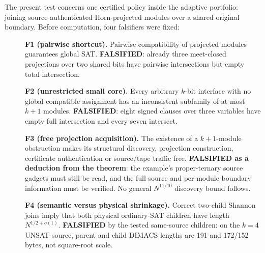 \documentclass[11pt]{article}
\begin{document}
The present test concerns one certified policy inside the adaptive portfolio:
joining source-authenticated Horn-projected modules over a shared original
boundary. Before computation, four falsifiers were fixed:
\begin{description}
\item[] \textbf{F1 (pairwise shortcut).} Pairwise compatibility of projected
modules guarantees global SAT. \textbf{FALSIFIED}: already three
meet-closed projections over two shared bits have pairwise intersections
but empty total intersection.
\item[] \textbf{F2 (unrestricted small core).} Every arbitrary $k$-bit
interface with no global compatible assignment has an inconsistent
subfamily of at most $k+1$ modules. \textbf{FALSIFIED}: eight signed clauses
over three variables have empty full intersection and every seven intersect.
\item[] \textbf{F3 (free projection acquisition).} The existence of a
$k+1$-module obstruction makes its structural discovery, projection
construction, certificate authentication or source/tape traffic free.
\textbf{FALSIFIED as a deduction from the theorem}: the example's
proper-ternary source gadgets must still be read, and the full source
and per-module boundary information must be verified. No general
$N^{11/10}$ discovery bound follows.
\item[] \textbf{F4 (semantic versus physical shrinkage).} Correct two-child
Shannon joins imply that both physical ordinary-SAT children have length
$N^{1/2+o(1)}$. \textbf{FALSIFIED} by the tested same-source children:
on the $k=4$ UNSAT source, parent and child DIMACS lengths are
191 and 172/152 bytes, not square-root scale.
\end{description}
\end{document}

